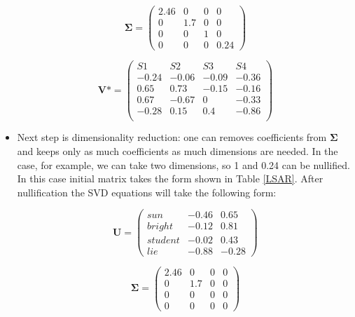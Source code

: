 \begin{itemize}
\begin{equation} \label{eq:Sigma}
\boldsymbol {\Sigma} = \begin{pmatrix}
2.46 & 0 & 0 & 0 \\
0 & 1.7 & 0 & 0 \\
0 & 0 & 1 & 0 \\
0 & 0 & 0 & 0.24
\end{pmatrix}
\end{equation}

\begin{equation} \label{eq:V}
\boldsymbol V* = \begin{pmatrix}
S1 & S2 & S3 & S4 \\
-0.24 & -0.06 & -0.09 & -0.36 \\
 0.65 & 0.73 & -0.15 & -0.16 \\
 0.67 & -0.67 & 0 & -0.33 \\
-0.28 & 0.15 & 0.4 & -0.86 \\
\end{pmatrix}
\end{equation}

\item Next step is dimensionality reduction: one can removes coefficients from  $\boldsymbol{\Sigma}$ and keeps only as much coefficients as much dimensions are needed. In the case, for example, we can take two dimensions, so 1 and 0.24 can be nullified. In this case initial matrix takes the form shown in Table \ref{LSAR}. After nullification the SVD equations will take the following form:

\begin{equation} \label{eq:U0}
\boldsymbol U = \begin{pmatrix}
sun & -0.46 & 0.65 \\
bright & -0.12 & 0.81 \\
student & -0.02 & 0.43 \\
lie & -0.88 & -0.28 
\end{pmatrix}
\end{equation}

\begin{equation} \label{eq:Sigma0}
\boldsymbol {\Sigma} = \begin{pmatrix}
2.46 & 0 & 0 & 0 \\
0 & 1.7 & 0 & 0 \\
0 & 0 & 0 & 0 \\
0 & 0 & 0 & 0
\end{pmatrix}
\end{equation}


\end{itemize}
